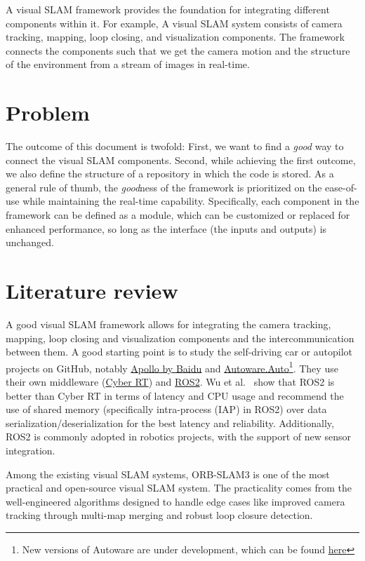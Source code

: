 A visual SLAM framework provides the foundation for integrating different components within it. 
For example, A visual SLAM system consists of camera tracking, mapping, loop closing, and visualization components. The framework connects the components such that we get the camera motion and the structure of the environment from a stream of images in real-time.


\section{Problem}

The outcome of this document is twofold: 
First, we want to find a \textit{good} way to connect the visual SLAM components. 
Second, while achieving the first outcome, we also define the structure of a repository in which the code is stored.
As a general rule of thumb, the \textit{good}ness of the framework is prioritized on the ease-of-use while maintaining the real-time capability.
Specifically, each component in the framework can be defined as a module, which can be customized or replaced for enhanced performance, so long as the interface (the inputs and outputs) is unchanged.

\section{Literature review}

A good visual SLAM framework allows for integrating the camera tracking, mapping, loop closing and visualization components and the intercommunication between them.
A good starting point is to study the self-driving car or autopilot projects on GitHub, notably \href{https://github.com/ApolloAuto/apollo}{Apollo by Baidu} and \href{https://gitlab.com/autowarefoundation/autoware.auto/AutowareAuto}{Autoware.Auto}\footnote{New versions of Autoware are under development, which can be found \href{https://github.com/autowarefoundation/autoware}{here}}.
They use their own middleware (\href{https://cyber-rt.readthedocs.io/en/latest/index.html}{Cyber RT}) and \href{https://docs.ros.org/en/humble/}{ROS2}. 
Wu et al.~\cite{wu2021oops} show that ROS2 is better than Cyber RT in terms of latency and CPU usage and recommend the use of shared memory (specifically intra-process (IAP) in ROS2) over data serialization/deserialization for the best latency and reliability.
Additionally, ROS2 is commonly adopted in robotics projects, with the support of new sensor integration. 

Among the existing visual SLAM systems, ORB-SLAM3 is one of the most practical and open-source visual SLAM system.
The practicality comes from the well-engineered algorithms designed to handle edge cases like improved camera tracking through multi-map merging and robust loop closure detection.

